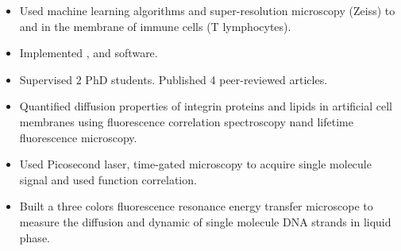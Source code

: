 \documentclass[10pt,a4paper,ragged2e,withhyper]{altacv}
\begin{document}
\begin{paracol}{2}
            \begin{itemize}
            
            	   	\item Used machine learning algorithms and super-resolution microscopy (Zeiss) to  and  in the membrane of immune cells (T lymphocytes).
	   		        \item Implemented  ,  and  software.
	   		        \item Supervised 2 PhD students. Published 4 peer-reviewed articles.
                
            \end{itemize}
            \divider
            
            \begin{itemize}
                \item Quantified diffusion properties of integrin proteins and lipids in artificial cell membranes using fluorescence correlation spectroscopy nand lifetime fluorescence microscopy.
                \item Used Picosecond laser, time-gated microscopy to acquire single molecule signal and used function correlation.
            \end{itemize}            
             \divider           
            \begin{itemize}
                \item Built a three colors fluorescence resonance energy transfer microscope to measure the diffusion and dynamic of single molecule DNA strands in liquid phase.     
            \end{itemize}
        

        
            

\end{paracol}
\end{document}
